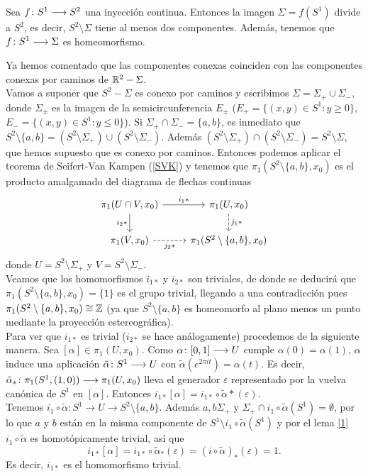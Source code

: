\documentclass[GTS.tex]{subfiles}
\begin{document}
\begin{prop}
Sea $f\colon{S^1}\longrightarrow{S^2}$ una inyección continua. Entonces la imagen $\Sigma=f(S^1)$ divide a $S^2$, es decir, $S^2\setminus\Sigma$ tiene al menos dos componentes. Además, tenemos que $f\colon{S^1}\longrightarrow{\Sigma}$ es homeomorfismo.
\end{prop}

\begin{dem}
Ya hemos comentado que las componentes conexas coinciden con las componentes conexas por caminos de $\mathbb{R}^2-\Sigma$.\\
Vamos a suponer que $S^2-\Sigma$ es conexo por caminos y escribimos $\Sigma=\Sigma_+\cup\Sigma_-$, donde $\Sigma_\pm$ es la imagen de la semicircunferencia $E_\pm$ ($E_+=\{(x,y)\in S^1: y\geq 0\}$, $E_-=\{(x,y)\in S^1: y\leq 0\}$). Si $\Sigma_+\cap\Sigma_-=\{a,b\}$, es inmediato que $S^2\setminus\{a,b\}=(S^2\setminus\Sigma_+)\cup(S^2\setminus\Sigma_-)$. Además $(S^2\setminus\Sigma_+)\cap(S^2\setminus\Sigma_-)=S^2\setminus\Sigma$, que hemos supuesto que es conexo por caminos. Entonces podemos aplicar el teorema de Seifert-Van Kampen (\ref{SVK}) y tenemos que $\pi_1(S^2\setminus\{a,b\},x_0)$ es el producto amalgamado del diagrama de flechas continuas
\[
\begin{tikzcd}
\pi_1(U\cap V,x_0)\arrow[r, "i_1*"]\arrow[d, "i_2*"'] & \pi_1(U,x_0)\arrow[d, dashed, "j_1*"]\\
\pi_1(V,x_0)\arrow[r,dashrightarrow, "j_2*"'] &\pi_1(S^2\setminus\{a,b\},x_0)
\end{tikzcd}
\]
donde $U=S^2\setminus\Sigma_+$ y $V=S^2\setminus\Sigma_-$.\\
Veamos que los homomorfismos $i_{1*}$ y $i_{2*}$ son triviales, de donde se deducirá que $\pi_1(S^2\setminus\{a,b\},x_0)=\{1\}$ es el grupo trivial, llegando a una contradicción pues $\pi_1(S^2\setminus\{a,b\},x_0)\cong\mathbb{Z}$ (ya que $S^2\setminus\{a,b\}$ es homeomorfo al plano menos un punto mediante la proyección estereográfica).\\
Para ver que $i_{1*}$ es trivial ($i_{2*}$ se hace análogamente) procedemos de la siguiente manera. Sea $[\alpha]\in\pi_1(U,x_0)$. Como $\alpha\colon{[0,1]}\longrightarrow{U}$ cumple $\alpha(0)=\alpha(1)$, $\alpha$ induce una aplicación $\tilde{\alpha}\colon{S^1}\longrightarrow{U}$ con $\tilde{\alpha}(e^{2\pi it})=\alpha(t)$. Es decir, $\tilde{\alpha}_*\colon{\pi_1(S^1,(1,0))}\longrightarrow{\pi_1(U,x_0)}$ lleva el generador $\varepsilon$ representado por la vuelva canónica de $S^1$ en $[\alpha]$. Entonces $i_{1*}[\alpha]=i_{1*}\circ\tilde{\alpha}*(\varepsilon)$.\\
Tenemos $i_1\circ\tilde{\alpha}:S^1\longrightarrow U\longrightarrow S^2\setminus\{a,b\}$. Además $a,b\Sigma_+$ y $\Sigma_+\cap i_1\circ\tilde{\alpha}(S^1)=\emptyset$, por lo que $a$ y $b$ están en la misma componente de $S^1\setminus i_1\circ\tilde{\alpha}(S^1)$ y por el lema \ref{1} $i_1\circ\tilde{\alpha}$ es homotópicamente trivial, así que
\[
i_{1*}[\alpha]=i_{1*}\circ\tilde{\alpha}_*(\varepsilon)=(i\circ\tilde{\alpha})_*(\varepsilon)=1.
\]
Es decir, $i_{1*}$ es el homomorfismo trivial.

\end{dem}
\end{document}
